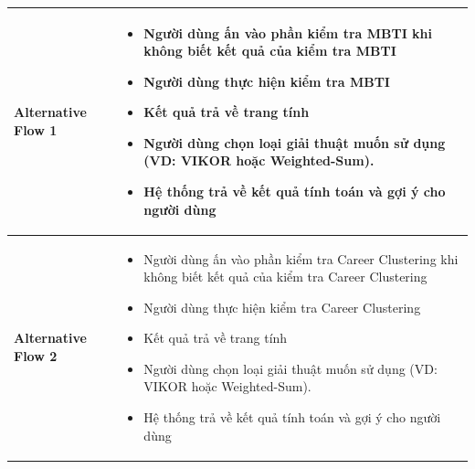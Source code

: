\begin{longtable}[H]{|l|p{}|}
        \hline
        
        \textbf{Alternative Flow 1} &  \vspace{-1cm} \begin{itemize}[leftmargin=4mm]
            \setlength\itemsep{0em}
            \item Người dùng ấn vào phần kiểm tra MBTI khi không biết kết quả của kiểm tra MBTI
            \item Người dùng thực hiện kiểm tra MBTI
            \item Kết quả trả về trang tính
            \item Người dùng chọn loại giải thuật muốn sử dụng (VD: VIKOR hoặc Weighted-Sum). 
            \item Hệ thống trả về kết quả tính toán và gợi ý cho người dùng
        \end{itemize} \\
        
        \hline
        
        \textbf{Alternative Flow 2} & \vspace{-1cm} \begin{itemize}[leftmargin=4mm]
            \setlength\itemsep{0em}
            \item Người dùng ấn vào phần kiểm tra Career Clustering 
            khi không biết kết quả của kiểm tra Career Clustering
            \item Người dùng thực hiện kiểm tra Career Clustering
            \item Kết quả trả về trang tính
            \item Người dùng chọn loại giải thuật muốn sử dụng (VD: VIKOR hoặc Weighted-Sum). 
            \item Hệ thống trả về kết quả tính toán và gợi ý cho người dùng
        \end{itemize} \\

        \hline 
        

\end{longtable}
